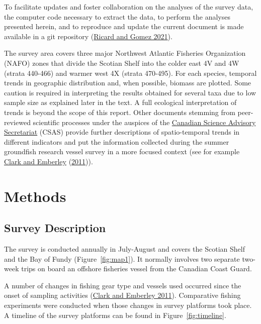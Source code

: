 \documentclass[12pt]{article}\usepackage[]{graphicx}\usepackage[]{color}
\begin{document}
To facilitate updates and foster collaboration on the analyses of the survey data, the computer code necessary to extract the data, to perform the analyses presented herein, and to reproduce and update the current document is made available in a git repository (\protect\hyperlink{ref-Ricard-Gomez-2021}{Ricard and Gomez 2021}).

The survey area covers three major Northwest Atlantic Fisheries Organization (NAFO) zones that divide the Scotian Shelf into the colder east 4V and 4W (strata 440-466) and warmer west 4X (strata 470-495). For each species, temporal trends in geographic distribution and, when possible, biomass are plotted. Some caution is required in interpreting the results obtained for several taxa due to low sample size as explained later in the text. A full ecological interpretation of trends is beyond the scope of this report. Other documents stemming from peer-reviewed scientific processes under the auspices of the \href{https://www.dfo-mpo.gc.ca/csas-sccs/}{Canadian Science Advisory Secretariat} (CSAS) provide further descriptions of spatio-temporal trends in different indicators and put the information collected during the summer groundfish research vessel survey in a more focused context (see for example \protect\hyperlink{ref-ClarkEmberley2011}{Clark and Emberley} (\protect\hyperlink{ref-ClarkEmberley2011}{2011})).

\hypertarget{methods}{%
\section{Methods}\label{methods}}

\hypertarget{survey-description}{%
\subsection{Survey Description}\label{survey-description}}

The survey is conducted annually in July-August and covers the Scotian Shelf and the Bay of Fundy (Figure~\ref{fig:map1}). It normally involves two separate two-week trips on board an offshore fisheries vessel from the Canadian Coast Guard.

A number of changes in fishing gear type and vessels used occurred since the onset of sampling activities (\protect\hyperlink{ref-ClarkEmberley2011}{Clark and Emberley 2011}). Comparative fishing experiments were conducted when those changes in survey platforms took place. A timeline of the survey platforms can be found in Figure~\ref{fig:timeline}.
\end{document}
